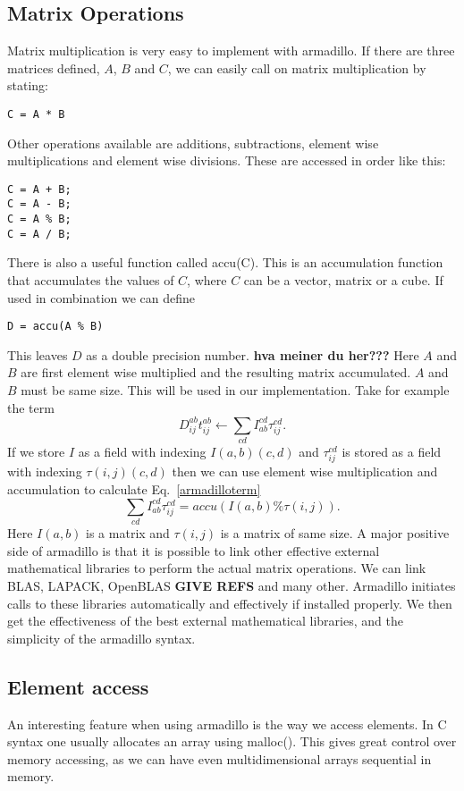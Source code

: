 \documentclass[a4paper,norsk,11pt,twoside]{report}
\begin{document}
\subsection{Matrix Operations}
Matrix multiplication is very easy to implement with armadillo. If there
are three matrices defined, $A$, $B$ and $C$, we can easily call on matrix
multiplication by stating:
\begin{lstlisting}
C = A * B 
\end{lstlisting}
Other operations available are additions, subtractions, element wise
multiplications and element wise divisions. These are accessed in
order like this:
\begin{lstlisting}
C = A + B;
C = A - B;
C = A % B;
C = A / B;
\end{lstlisting}
There is also a useful function called accu(C). This is an accumulation function that accumulates the values of $C$, where $C$ can be a vector, matrix or a cube. If used in combination we can define
\begin{lstlisting}
D = accu(A % B)
\end{lstlisting}
This leaves $D$ as a double precision number. 
{\bf hva meiner du her???} Here $A$ and $B$ are
first element wise multiplied and the resulting matrix accumulated. $A$
and $B$ must be same size. This will be used in our implementation. Take
for example the term
\begin{equation}
D_{ij}^{ab} t_{ij}^{ab} \leftarrow \sum_{cd} I_{ab}^{cd} \tau_{ij}^{cd} . \label{armadilloterm}
\end{equation}
If we store $I$ as a field with indexing $I(a,b)(c,d)$ and
$\tau_{ij}^{cd}$ is stored as a field with indexing $\tau(i,j)(c,d)$
then we can use element wise multiplication and accumulation to
calculate Eq.~\eqref{armadilloterm}
\begin{equation}
\sum_{cd} I_{ab}^{cd} \tau_{ij}^{cd}
= accu(I(a,b) \% \tau(i,j)) .
\end{equation}
Here $I(a,b)$ is a matrix and $\tau(i,j)$ is a matrix of same size. A
major positive side of armadillo is that it is possible to link other
effective external mathematical libraries to perform the actual matrix
operations. We can link BLAS, LAPACK, OpenBLAS {\bf GIVE REFS} and many
other. Armadillo initiates calls to these libraries automatically and
effectively if installed properly. We then get the effectiveness of
the best external mathematical libraries, and the simplicity of the armadillo
syntax.

\subsection{Element access}
An interesting feature when using armadillo is the way we access
elements. In C syntax one usually allocates an array using
malloc(). This gives great control over memory accessing, as we can
have even multidimensional arrays sequential in memory. \\
\end{document}
